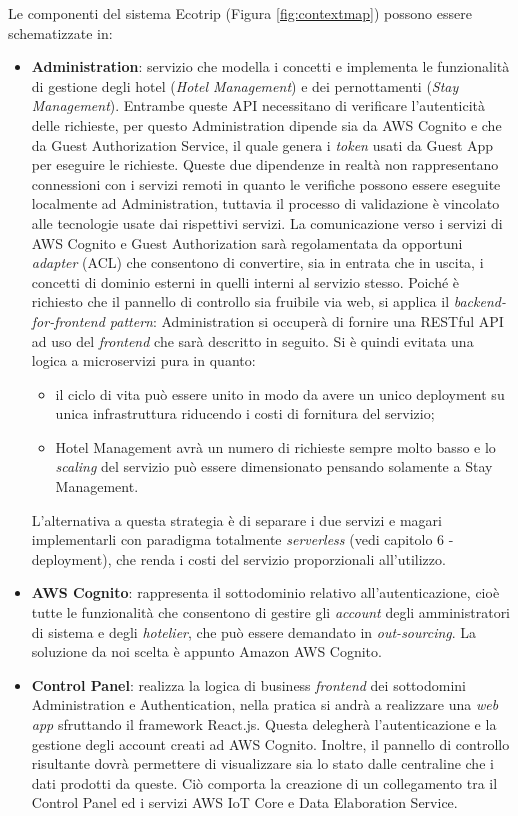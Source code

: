 Le componenti del sistema Ecotrip (Figura \ref{fig:contextmap}) possono essere schematizzate in:
\begin{itemize}
    \item \textbf{Administration}: servizio che modella  i concetti e implementa le funzionalità di gestione degli hotel (\textit{Hotel Management}) e dei pernottamenti (\textit{Stay Management}).  Entrambe queste API necessitano di verificare l'autenticità delle richieste, per questo Administration dipende sia da AWS Cognito e che da Guest Authorization Service, il quale genera i \textit{token} usati da Guest App per eseguire le richieste. Queste due dipendenze in realtà non rappresentano connessioni con i servizi remoti in quanto le verifiche possono essere eseguite localmente ad Administration, tuttavia il processo di validazione è vincolato alle tecnologie usate dai rispettivi servizi. La comunicazione verso i servizi di AWS Cognito e Guest Authorization sarà regolamentata da opportuni \textit{adapter} (ACL) che consentono di convertire, sia in entrata che in uscita, i concetti di dominio esterni in quelli interni al servizio stesso.  
    Poiché è richiesto che il pannello di controllo sia fruibile via web, si applica il \textit{backend-for-frontend pattern}: Administration si occuperà di fornire una RESTful API ad uso del \textit{frontend} che sarà descritto in seguito.
    Si è quindi evitata una logica a microservizi pura in quanto:
    \begin{itemize}
        \item il ciclo di vita può essere unito in modo da avere un unico deployment su unica infrastruttura riducendo i costi di fornitura del servizio;
        \item Hotel Management avrà un numero di richieste sempre molto basso e lo \textit{scaling} del servizio può essere dimensionato pensando solamente a Stay Management.
    \end{itemize}
    L'alternativa a questa strategia è di separare i due servizi e magari implementarli con paradigma totalmente \textit{serverless} (vedi capitolo 6 - deployment), che renda i costi del servizio proporzionali all'utilizzo.
    \item \textbf{AWS Cognito}: rappresenta il sottodominio relativo all'autenticazione, cioè tutte le funzionalità che consentono di gestire gli \textit{account} degli amministratori di sistema e degli \textit{hotelier}, che può essere demandato in \textit{out-sourcing}. La soluzione da noi scelta è appunto Amazon AWS Cognito.
    \item \textbf{Control Panel}: realizza la logica di business \textit{frontend} dei sottodomini Administration e Authentication, nella pratica si andrà a realizzare una \textit{web app} sfruttando il framework React.js. Questa delegherà l'autenticazione e la gestione degli account creati ad AWS Cognito. Inoltre, il pannello di controllo risultante dovrà permettere di visualizzare sia lo stato dalle centraline che i dati prodotti da queste. Ciò comporta la creazione di un collegamento tra il Control Panel ed i servizi AWS IoT Core e Data Elaboration Service.

\end{itemize}
